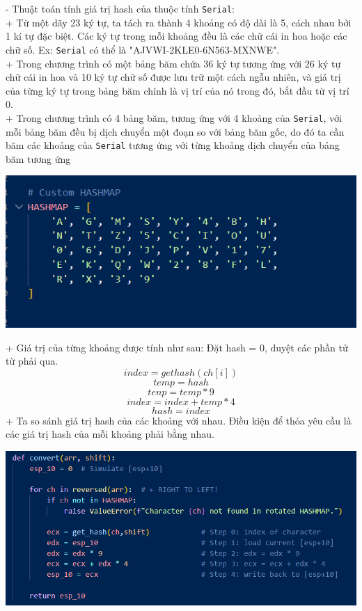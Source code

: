 - Thuật toán tính giá trị hash của thuộc tính \texttt{Serial}:\\
+ Từ một dãy 23 ký tự, ta tách ra thành 4 khoảng có độ dài là 5, cách nhau bởi 1 kí tự đặc biệt. Các ký tự trong mỗi khoảng đều là các chữ cái in hoa hoặc các chữ số. Ex: \texttt{Serial} có thể là "AJVWI-2KLE0-6N563-MXNWE". \\
+ Trong chương trình có một bảng băm chứa 36 ký tự tương ứng với 26 ký tự chữ cái in hoa và 10 ký tự chữ số được lưu trữ một cách ngẫu nhiên, và giá trị của từng ký tự trong bảng băm chính là vị trí của nó trong đó, bắt đầu từ vị trí 0.\\
+ Trong chương trình có 4 bảng băm, tương ứng với 4 khoảng của \texttt{Serial}, với mỗi bảng băm đều bị dịch chuyển một đoạn so với bảng băm gốc, do đó ta cần băm các khoảng của \texttt{Serial} tương ứng với từng khoảng dịch chuyển của bảng băm tương ứng\\
\begin{center}
    \includegraphics[width=\textwidth]{img/file-2/code2.PNG}
\end{center}
+ Giá trị của từng khoảng được tính như sau:
Đặt hash = 0, duyệt các phần tử từ phải qua.\\
\[
    index = gethash(ch[i])
\]
\[
    temp = hash
\]
\[
    tenp = temp * 9
\]
\[
    index = index + temp * 4
\]
\[
    hash = index
\]
+ Ta so sánh giá trị hash của các khoảng với nhau. Điều kiện để thỏa yêu cầu là các giá trị hash của mỗi khoảng phải bằng nhau.

\begin{center}
    \includegraphics[width=\textwidth]{img/file-2/code3.PNG}
\end{center}